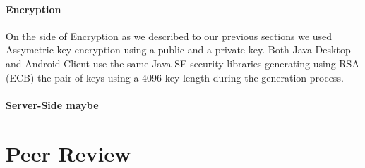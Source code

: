 \documentclass[11pt,a4paper]{report}
\begin{document}
\subsubsection{Encryption}
On the side of Encryption as we described to our previous sections we used Assymetric key encryption using a public and a private key. Both Java Desktop and Android Client use the same Java SE security libraries generating using RSA (ECB) the pair of keys using a 4096 key length during the generation process.
\subsubsection{Server-Side maybe}


\chapter{Peer Review}


{
}
\end{document}
